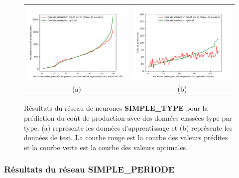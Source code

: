 \begin{figure}[H]
	\centering
	\begin{tabular}{c c}
		\includegraphics[width=9cm]{images_these/SequentialModel_prediction_train_by_type.pdf}&
		\includegraphics[width=9cm]{images_these/SequentialModel_prediction_test_by_type.pdf}
		\\
		(a) & (b)
	\end{tabular}
	\caption[Résultats du réseau de neurones SIMPLE\_TYPE]{Résultats du réseau de neurones \textbf{SIMPLE\_TYPE} pour la prédiction du coût de production avec des données classées type par type. (a) représente les données d'apprentissage et (b) représente les données de test. La courbe rouge est la courbe des valeurs prédites et la courbe verte est la courbe des valeurs optimales.}\label{6000_SequentialModel_prediction_by_type_0}
\end{figure}
  
  
  \subsubsection{Résultats du réseau \textbf{SIMPLE\_PERIODE}}
  
  
